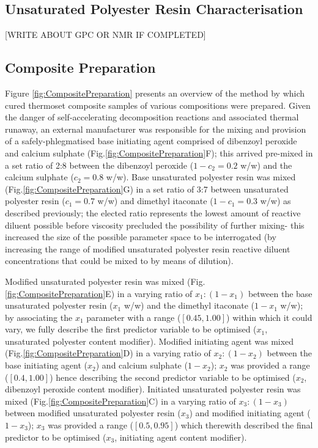 \subsection{Unsaturated Polyester Resin Characterisation}
[WRITE ABOUT GPC OR NMR IF COMPLETED]

\subsection{Composite Preparation}
Figure \ref{fig:CompositePreparation} presents an overview of the method by
 which cured thermoset composite samples of various compositions were
 prepared.
Given the danger of self-accelerating decomposition reactions and associated
 thermal runaway, an external manufacturer was responsible for the mixing
 and provision of a safely-phlegmatised base initiating agent comprised of
 dibenzoyl peroxide and calcium sulphate
 (Fig.\ref{fig:CompositePreparation}F); this arrived pre-mixed in a set ratio
 of 2:8 between the dibenzoyl peroxide (\(1-c_{2}=0.2\) w/w) and the
 calcium sulphate (\(c_{2}=0.8\) w/w).
Base unsaturated polyester resin was mixed
 (Fig.\ref{fig:CompositePreparation}G) in a set ratio of 3:7 between
 unsaturated polyester resin (\(c_{1}=0.7\) w/w) and dimethyl
 itaconate (\(1-c_{1}=0.3\) w/w) as described previously; the elected
 ratio represents the lowest amount of reactive diluent possible before
 viscosity precluded the possibility of further mixing- this increased
 the size of the possible parameter space to be interrogated (by increasing
 the range of modified unsaturated polyester resin reactive diluent
 concentrations that could be mixed to by means of dilution).

Modified unsaturated polyester resin was mixed
 (Fig.\ref{fig:CompositePreparation}E) in a varying ratio of
 \(x_{1}:(1-x_{1})\) between the base unsaturated polyester resin
 (\(x_{1}\) w/w) and the dimethyl itaconate (\(1-x_{1}\) w/w); by associating
 the \(x_{1}\) parameter with a range (\([0.45,1.00]\)) within which it
 could vary, we fully describe the first predictor variable to be optimised
 (\(x_{1}\), unsaturated polyester content modifier).
Modified initiating agent was mixed (Fig.\ref{fig:CompositePreparation}D)
 in a varying ratio of \(x_{2}:(1-x_{2})\) between the base initiating agent
 (\(x_{2}\)) and calcium sulphate (\(1-x_{2}\)); \(x_{2}\) was provided
 a range (\([0.4,1.00]\)) hence describing the second predictor variable
 to be optimised (\(x_{2}\), dibenzoyl peroxide content modifier).
Initiated unsaturated polyester resin was mixed
 (Fig.\ref{fig:CompositePreparation}C) in a varying ratio of
 \(x_{3}:(1-x_{3})\) between modified unsaturated polyester resin
 (\(x_{3}\)) and modified initiating agent (\(1-x_{3}\)); \(x_{3}\) was 
 provided a range (\([0.5,0.95]\)) which therewith described the final
 predictor to be optimised (\(x_{3}\), initiating agent content modifier).

